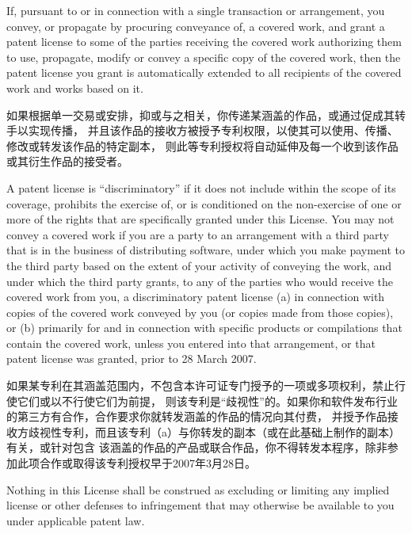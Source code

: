 \documentclass[11pt]{article}
\begin{document}
\begin{enumerate}
        If, pursuant to or in connection with a single transaction or
        arrangement, you convey, or propagate by procuring conveyance of, a
        covered work, and grant a patent license to some of the parties
        receiving the covered work authorizing them to use, propagate, modify
        or convey a specific copy of the covered work, then the patent license
        you grant is automatically extended to all recipients of the covered
        work and works based on it.

        如果根据单一交易或安排，抑或与之相关，你传递某涵盖的作品，或通过促成其转手以实现传播，
        并且该作品的接收方被授予专利权限，以使其可以使用、传播、修改或转发该作品的特定副本，
        则此等专利授权将自动延伸及每一个收到该作品或其衍生作品的接受者。

        A patent license is ``discriminatory'' if it does not include within
        the scope of its coverage, prohibits the exercise of, or is
        conditioned on the non-exercise of one or more of the rights that are
        specifically granted under this License.  You may not convey a covered
        work if you are a party to an arrangement with a third party that is
        in the business of distributing software, under which you make payment
        to the third party based on the extent of your activity of conveying
        the work, and under which the third party grants, to any of the
        parties who would receive the covered work from you, a discriminatory
        patent license (a) in connection with copies of the covered work
        conveyed by you (or copies made from those copies), or (b) primarily
        for and in connection with specific products or compilations that
        contain the covered work, unless you entered into that arrangement,
        or that patent license was granted, prior to 28 March 2007.

        如果某专利在其涵盖范围内，不包含本许可证专门授予的一项或多项权利，禁止行使它们或以不行使它们为前提，
        则该专利是“歧视性”的。如果你和软件发布行业的第三方有合作，合作要求你就转发涵盖的作品的情况向其付费，
        并授予作品接收方歧视性专利，而且该专利（a）与你转发的副本（或在此基础上制作的副本）有关，或针对包含
        该涵盖的作品的产品或联合作品，你不得转发本程序，除非参加此项合作或取得该专利授权早于2007年3月28日。

        Nothing in this License shall be construed as excluding or limiting
        any implied license or other defenses to infringement that may
        otherwise be available to you under applicable patent law.


\end{enumerate}
\end{document}
